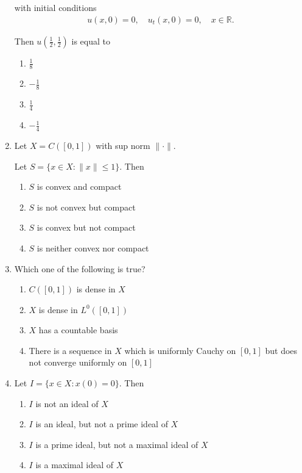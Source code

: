 \documentclass[journal]{IEEEtran}
\numberwithin{equation}{enumi}
\numberwithin{figure}{enumi}
\begin{document}
\begin{enumerate}
with initial conditions
\begin{align}
    u(x,0) = 0, \quad u_t(x,0) = 0, \quad x \in \mathbb{R}.
\end{align}

Then $u\left(\frac{1}{2}, \frac{1}{2}\right)$ is equal to
\hfill{}
\begin{multicols}{4}
\begin{enumerate}
    \item $\frac{1}{8}$
    \item $-\frac{1}{8}$
    \item $\frac{1}{4}$
    \item $-\frac{1}{4}$
\end{enumerate}
\end{multicols}

\item
Let $X = C([0,1])$ with sup norm $\|\cdot\|$.

Let $S = \{x \in X : \|x\| \leq 1\}$. Then
\hfill{}
\begin{multicols}{2}
\begin{enumerate}
    \item $S$ is convex and compact
    \item $S$ is not convex but compact
    \item $S$ is convex but not compact
    \item $S$ is neither convex nor compact
\end{enumerate}
\end{multicols}

\item
Which one of the following is true?
\hfill{}

\begin{enumerate}
    \item $C([0,1])$ is dense in $X$
    \item $X$ is dense in $L^0([0,1])$
    \item $X$ has a countable basis
    \item There is a sequence in $X$ which is uniformly Cauchy on $[0,1]$ but does not converge uniformly on $[0,1]$
\end{enumerate}


\item
Let $I = \{x \in X : x(0) = 0\}$. Then
\hfill{}

\begin{enumerate}
    \item $I$ is not an ideal of $X$
    \item $I$ is an ideal, but not a prime ideal of $X$
    \item $I$ is a prime ideal, but not a maximal ideal of $X$
    \item $I$ is a maximal ideal of $X$
\end{enumerate}



\end{enumerate}
\end{document}
